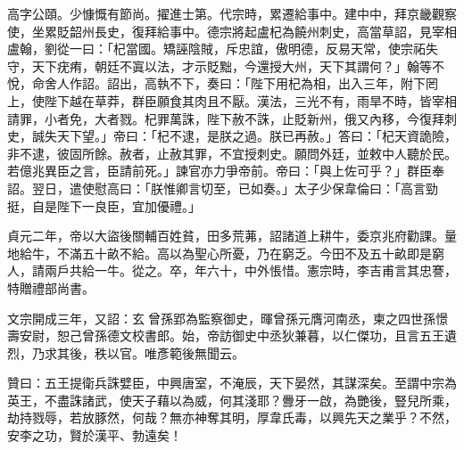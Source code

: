 \begin{pinyinscope}
 高字公頤。少慷慨有節尚。擢進士第。代宗時，累遷給事中。建中中，拜京畿觀察使，坐累貶韶州長史，復拜給事中。德宗將起盧杞為饒州刺史，高當草詔，見宰相盧翰，劉從一曰：「杞當國。矯誣陰賊，斥忠誼，傲明德，反易天常，使宗祏失守，天下疣痏，朝廷不寘以法，才示貶黜，今還授大州，天下其謂何？」翰等不悅，命舍人作詔。詔出，高執不下，奏曰：「陛下用杞為相，出入三年，附下罔上，使陛下越在草莽，群臣願食其肉且不厭。漢法，三光不有，雨旱不時，皆宰相請罪，小者免，大者戮。杞罪萬誅，陛下赦不誅，止貶新州，俄又內移，今復拜刺史，誠失天下望。」帝曰：「杞不逮，是朕之過。朕已再赦。」答曰：「杞天資詭險，非不逮，彼固所餘。赦者，止赦其罪，不宜授刺史。願問外廷，並敕中人聽於民。若億兆異臣之言，臣請前死。」諫官亦力爭帝前。帝曰：「與上佐可乎？」群臣奉詔。翌日，遣使慰高曰：「朕惟卿言切至，已如奏。」太子少保韋倫曰：「高言勁挺，自是陛下一良臣，宜加優禮。」



 貞元二年，帝以大盜後關輔百姓貧，田多荒茀，詔諸道上耕牛，委京兆府勸課。量地給牛，不滿五十畝不給。高以為聖心所憂，乃在窮乏。今田不及五十畝即是窮人，請兩戶共給一牛。從之。卒，年六十，中外悵惜。憲宗時，李吉甫言其忠謇，特贈禮部尚書。



 文宗開成三年，又詔：玄曾孫郢為監察御史，暉曾孫元膺河南丞，柬之四世孫憬壽安尉，恕己曾孫德文校書郎。始，帝訪御史中丞狄兼暮，以仁傑功，且言五王遺烈，乃求其後，秩以官。唯彥範後無聞云。



 贊曰：五王提衛兵誅嬖臣，中興唐室，不淹辰，天下晏然，其謀深矣。至謂中宗為英王，不盡誅諸武，使天子藉以為威，何其淺耶？釁牙一啟，為艷後，豎兒所乘，劫持戮辱，若放豚然，何哉？無亦神奪其明，厚韋氏毒，以興先天之業乎？不然，安李之功，賢於漢平、勃遠矣！



\end{pinyinscope}